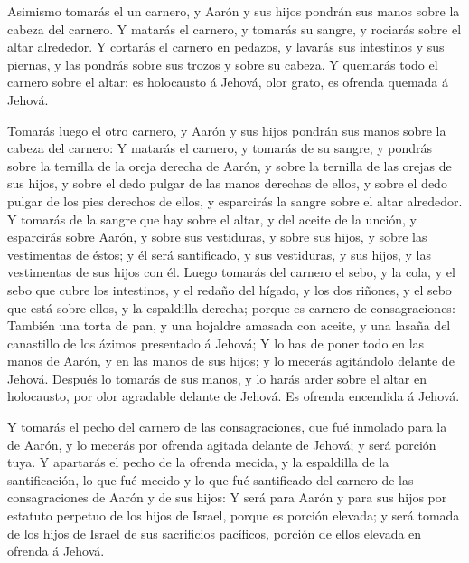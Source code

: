  Asimismo tomarás el un carnero, y Aarón y sus hijos
pondrán sus manos sobre la cabeza del carnero.  Y matarás
el carnero, y tomarás su sangre, y rociarás sobre el altar alrededor.
 Y cortarás el carnero en pedazos, y lavarás sus
intestinos y sus piernas, y las pondrás sobre sus trozos y sobre su
cabeza.  Y quemarás todo el carnero sobre el altar: es
holocausto á Jehová, olor grato, es ofrenda quemada á Jehová.

 Tomarás luego el otro carnero, y Aarón y sus hijos
pondrán sus manos sobre la cabeza del carnero:  Y matarás
el carnero, y tomarás de su sangre, y pondrás sobre la ternilla de la
oreja derecha de Aarón, y sobre la ternilla de las orejas de sus hijos,
y sobre el dedo pulgar de las manos derechas de ellos, y sobre el dedo
pulgar de los pies derechos de ellos, y esparcirás la sangre sobre el
altar alrededor.  Y tomarás de la sangre que hay sobre el
altar, y del aceite de la unción, y esparcirás sobre Aarón, y sobre sus
vestiduras, y sobre sus hijos, y sobre las vestimentas de éstos; y él
será santificado, y sus vestiduras, y sus hijos, y las vestimentas de
sus hijos con él.  Luego tomarás del carnero el sebo, y
la cola, y el sebo que cubre los intestinos, y el redaño del hígado, y
los dos riñones, y el sebo que está sobre ellos, y la espaldilla
derecha; porque es carnero de consagraciones:  También
una torta de pan, y una hojaldre amasada con aceite, y una lasaña del
canastillo de los ázimos presentado á Jehová;  Y lo has
de poner todo en las manos de Aarón, y en las manos de sus hijos; y lo
mecerás agitándolo delante de Jehová.  Después lo tomarás
de sus manos, y lo harás arder sobre el altar en holocausto, por olor
agradable delante de Jehová. Es ofrenda encendida á Jehová.

 Y tomarás el pecho del carnero de las consagraciones,
que fué inmolado para la de Aarón, y lo mecerás por ofrenda agitada
delante de Jehová; y será porción tuya.  Y apartarás el
pecho de la ofrenda mecida, y la espaldilla de la santificación, lo que
fué mecido y lo que fué santificado del carnero de las consagraciones de
Aarón y de sus hijos:  Y será para Aarón y para sus hijos
por estatuto perpetuo de los hijos de Israel, porque es porción elevada;
y será tomada de los hijos de Israel de sus sacrificios pacíficos,
porción de ellos elevada en ofrenda á Jehová.

